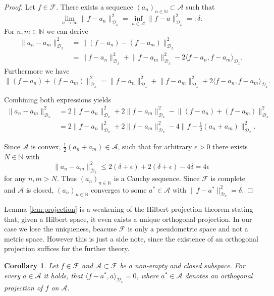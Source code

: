 \documentclass[11pt, a4paper]{article}
\newtheorem{corollary}[theorem]{Corollary}
\newcommand{\N}{\mathbb{N}}
\newcommand{\A}{\mathcal{A}}
\newcommand{\D}{\mathcal{D}}
\newcommand{\F}{\mathcal{F}}
\begin{document}
\begin{proof}
Let $f \in \F$. There exists a sequence $(a_n)_{n \in \N} \subset \A$ such that
\[ \lim_{n \to \infty} \big \| f - a_n \big \|_{\D_x}^2 = \inf_{a \in \A} \big \| f - a \big \|_{\D_x}^2 =: \delta. \]
For $n,m \in \N$ we can derive
\[ \begin{split}
\big \| a_n - a_m \big \|_{\D_x}^2 
&= \big \| (f-a_n) - (f-a_m) \big \|_{\D_x}^2 \\\
&= \big \| f - a_n \big \|_{\D_x}^2 + \big \| f - a_m \big \|_{\D_x}^2 - 2 \big \langle f-a_n, f-a_m \big \rangle_{\D_x}.
\end{split} \]
Furthermore we have
\[ \big \| (f-a_n) + (f-a_m) \big \|_{\D_x}^2 = \big \| f - a_n \big \|_{\D_x}^2 + \big \| f - a_m \big \|_{\D_x}^2 + 2 \big \langle f-a_n, f-a_m \big \rangle_{\D_x}. \]

Combining both expressions yields
\[ \begin{split}
\big \| a_n - a_m \big \|_{\D_x}^2 
&= 2 \big \| f - a_n \big \|_{\D_x}^2 + 2 \big \| f - a_m \big \|_{\D_x}^2 - \big \| (f-a_n) + (f-a_m) \big \|_{\D_x}^2 \\\
&= 2 \big \| f - a_n \big \|_{\D_x}^2 + 2 \big \| f - a_m \big \|_{\D_x}^2 - 4 \big \| f - \frac{1}{2}(a_n+a_m) \big \|_{\D_x}^2.
\end{split} \]

Since $\A$ is convex, $\frac{1}{2}(a_n + a_m) \in \A$, such that for arbitrary $\epsilon > 0$ there exists $N \in \N$ with 
\[ \big \| a_n - a_m \big \|_{\D_x}^2 \leq 2(\delta + \epsilon) + 2(\delta + \epsilon) - 4\delta = 4\epsilon \]
for any $n,m > N$. Thus $(a_n)_{n \in \N}$ is a Cauchy sequence. Since $\F$ is complete and $\A$ is closed, $(a_n)_{n \in \N}$ converges to some $a^* \in \A$ with $\big \| f - a^* \big \|_{\D_x}^2 = \delta$.
\end{proof}

Lemma \ref{lem:projection} is a weakening of the Hilbert projection theorem stating that, given a Hilbert space, it even exists a unique orthogonal projection. In our case we lose the uniqueness, beacuse $\F$ is only a pseudometric space and not a metric space. However this is just a side note, since the existence of an orthogonal projection suffices for the further theory.

\begin{corollary} \label{cor:projection}
Let $f \in \F$ and $\A \subset \F$ be a non-empty and closed subspace. For every $a \in \A$ it holds, that $\langle f - a^* , a \rangle_{\D_x} = 0$, where $a^* \in \A$ denotes an orthogonal projection of $f$ on $\A$.
\end{corollary}
\end{document}
